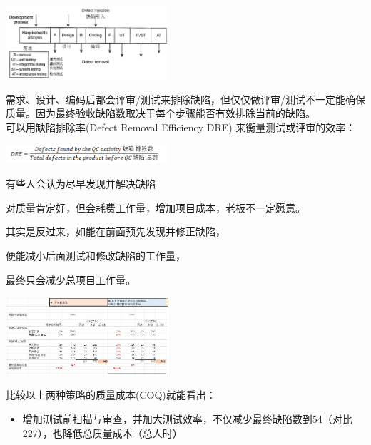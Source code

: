 \includegraphics[width=6cm]{Jalote_emm_71-1.jpg}

需求、设计、编码后都会评审/测试来排除缺陷，但仅仅做评审/测试不一定能确保质量。因为最终验收缺陷数取决于每个步骤能否有效排除当前的缺陷。\\

可以用缺陷排除率(Defect Removal Efficiency DRE) 来衡量测试或评审的效率：



\includegraphics[width=6cm]{Ma3_10.png}

有些人会认为尽早发现并解决缺陷

对质量肯定好，但会耗费工作量，增加项目成本，老板不一定愿意。

其实是反过来，如能在前面预先发现并修正缺陷，

便能减小后面测试和修改缺陷的工作量，

最终只会减少总项目工作量。

\includegraphics[width=6cm]{AR1FixVarCostScreenshot_2022-12-10_144400.jpg}

比较以上两种策略的质量成本(COQ)就能看出：

\begin{itemize}
\tightlist
\item
  增加测试前扫描与审查，并加大测试效率，不仅减少最终缺陷数到54（对比227），也降低总质量成本（总人时）
\end{itemize}

